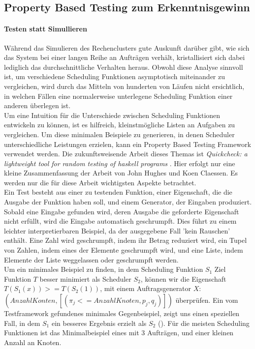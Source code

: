 \FloatBarrier
\subsection{Property Based Testing zum Erkenntnisgewinn}
\label{proptest}
\paragraph{Testen statt Simullieren}
Während das Simulieren des Rechenclusters gute Auskunft darüber gibt, wie sich das System bei einer langen Reihe an Aufträgen verhält, kristallisiert sich dabei lediglich das durchschnittliche Verhalten heraus. Obwohl diese Analyse sinnvoll ist, um verschiedene Scheduling Funktionen asymptotisch miteinander zu vergleichen, wird durch das Mitteln von hunderten von Läufen nicht ersichtlich, in welchen Fällen eine normalerweise unterlegene Scheduling Funktion einer anderen überlegen ist.\\
Um eine Intuition für die Unterschiede zwischen Scheduling Funktionen entwickeln zu können, ist es hilfreich, kleinstmögliche Listen an Aufgaben zu vergleichen. Um diese minimalen Beispiele zu generieren, in denen Scheduler unterschiedliche Leistungen erzielen, kann ein Property Based Testing Framework verwendet werden. Die zukunftsweisende Arbeit dieses Themas ist \emph{Quickcheck: a lightweight tool for random testing of haskell programs} \cite{hughes2000quickcheck}. Hier erfolgt nur eine kleine Zusammenfassung der Arbeit von John Hughes und Koen Claessen. Es werden nur die für diese Arbeit wichtigsten Aspekte betrachtet. \\
Ein Test besteht aus einer zu testenden Funktion, einer Eigenschaft, die die Ausgabe der Funktion haben soll, und einem Generator, der Eingaben produziert. Sobald eine Eingabe gefunden wird, deren Ausgabe die geforderte Eigenschaft nicht erfüllt, wird die Eingabe automatisch geschrumpft. Dies führt zu einem leichter interpretierbaren Beispiel, da der ausgegebene Fall 'kein Rauschen' enthält.
Eine Zahl wird geschrumpft, indem ihr Betrag reduziert wird, ein Tupel von Zahlen, indem eines der Elemente geschrumpft wird, und eine Liste, indem Elemente der Liste weggelassen oder geschrumpft werden.\\

Um ein minimales Beispiel zu finden, in dem Scheduling Funktion $S_1$ Ziel Funktion $T$ besser minimiert als Scheduler $S_2$, können wir die Eigenschaft $T(S_1(x)) >= T (S_2(1))$, mit einem Auftragsgenerator $X$: $(Anzahl Konten,[(\pi_j <= Anzahl Knoten,p_j,q_j)])$ überprüfen.
Ein vom Testframework gefundenes minimales Gegenbeispiel, zeigt uns einen speziellen Fall, in dem $S_1$ ein besseres Ergebnis erzielt als $S_2$ (\cite{TestOpt}).
Für die meisten Scheduling Funktionen ist das Minimalbeispiel eines mit 3 Aufträgen, und einer kleinen Anzahl an Knoten.

